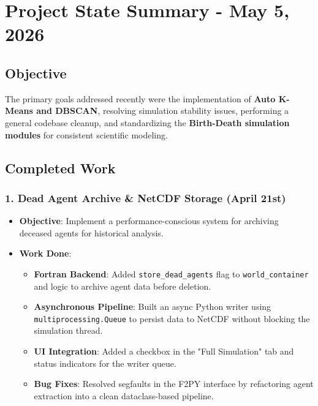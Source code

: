 \chapter{Project State Summary - May 5, 2026}

\section{Objective}
The primary goals addressed recently were the implementation of \textbf{Auto K-Means and DBSCAN}, resolving simulation stability issues, performing a general codebase cleanup, and standardizing the \textbf{Birth-Death simulation modules} for consistent scientific modeling.

\section{Completed Work}

\subsection{1. Dead Agent Archive \& NetCDF Storage (April 21st)}
\begin{itemize}
\item \textbf{Objective}: Implement a performance-conscious system for archiving deceased agents for historical analysis.
\item \textbf{Work Done}:
\begin{itemize}
\item \textbf{Fortran Backend}: Added \texttt{store\_dead\_agents} flag to \texttt{world\_container} and logic to archive agent data before deletion.
\item \textbf{Asynchronous Pipeline}: Built an async Python writer using \texttt{multiprocessing.Queue} to persist data to NetCDF without blocking the simulation thread.
\item \textbf{UI Integration}: Added a checkbox in the "Full Simulation" tab and status indicators for the writer queue.
\item \textbf{Bug Fixes}: Resolved segfaults in the F2PY interface by refactoring agent extraction into a clean dataclass-based pipeline.
\end{itemize}
\end{itemize}

